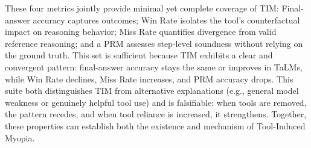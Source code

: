 \documentclass[11pt]{article}
\def \task{\textsc{TIM}\xspace}
\newcommand{\pouya}[1]{{\color{violet}Pouya: #1}}
\begin{document}
These four metrics jointly provide minimal yet complete coverage of \task{}: Final-answer accuracy captures outcomes; Win Rate isolates the tool's counterfactual impact on reasoning behavior; Miss Rate quantifies divergence from valid reference reasoning; and a PRM assesses step-level soundness without relying on the ground truth. This set is sufficient because \task{} exhibits a clear and convergent pattern: final-answer accuracy stays the same or improves in TaLMs, while Win Rate declines, Miss Rate increases, and PRM accuracy drops. This suite both distinguishes \task{} from alternative explanations (e.g., general model weakness or genuinely helpful tool use) and is falsifiable: when tools are removed, the pattern recedes, and when tool reliance is increased, it strengthens. Together, these properties can establish both the existence and mechanism of Tool-Induced Myopia.


\end{document}
